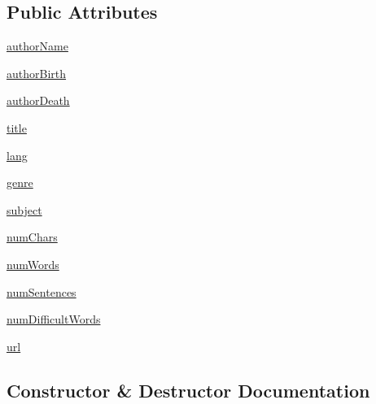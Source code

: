 \subsection*{Public Attributes}
\begin{DoxyCompactItemize}
\item 
\hyperlink{class_gutenberg_book_1_1_gutenberg_book_aa791b333bc15083ffcd70e31565c3ce0}{author\+Name}
\item 
\hyperlink{class_gutenberg_book_1_1_gutenberg_book_aa470512f70b49c44577cda4167a2abe4}{author\+Birth}
\item 
\hyperlink{class_gutenberg_book_1_1_gutenberg_book_a271f557aa0ed0b5a1430b7250e5c6da9}{author\+Death}
\item 
\hyperlink{class_gutenberg_book_1_1_gutenberg_book_adbf667fb4a34b8937c3c4e755f62b3dd}{title}
\item 
\hyperlink{class_gutenberg_book_1_1_gutenberg_book_a4186b4fde315e2e55f3d9833a620c952}{lang}
\item 
\hyperlink{class_gutenberg_book_1_1_gutenberg_book_ab26f43198c585ea7b4b1413250e75d78}{genre}
\item 
\hyperlink{class_gutenberg_book_1_1_gutenberg_book_ae8cefa9cabbbbe09e919b9c0e8f6577e}{subject}
\item 
\hyperlink{class_gutenberg_book_1_1_gutenberg_book_a8d0bd46f760033b5ddc164d74c5f9f41}{num\+Chars}
\item 
\hyperlink{class_gutenberg_book_1_1_gutenberg_book_a03bded71365c803889b37370001bc679}{num\+Words}
\item 
\hyperlink{class_gutenberg_book_1_1_gutenberg_book_ae2b9fe952d14c8193d95f5ed2a51e679}{num\+Sentences}
\item 
\hyperlink{class_gutenberg_book_1_1_gutenberg_book_a702230ada41f3fbf9daa27234893c8d7}{num\+Difficult\+Words}
\item 
\hyperlink{class_gutenberg_book_1_1_gutenberg_book_a1b1ef102b505b472d010795193a1594c}{url}
\end{DoxyCompactItemize}


\subsection{Constructor \& Destructor Documentation}
\hypertarget{class_gutenberg_book_1_1_gutenberg_book_ab54eccb3d7735821ded27353cc967139}{}
